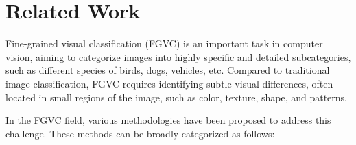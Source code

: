 \section{Related Work}
\label{sec:related_work}

Fine-grained visual classification (FGVC) is an important task in computer vision, aiming to categorize images into highly specific and detailed subcategories, such as different species of birds, dogs, vehicles, etc. Compared to traditional image classification, FGVC requires identifying subtle visual differences, often located in small regions of the image, such as color, texture, shape, and patterns.

In the FGVC field, various methodologies have been proposed to address this challenge. These methods can be broadly categorized as follows:


